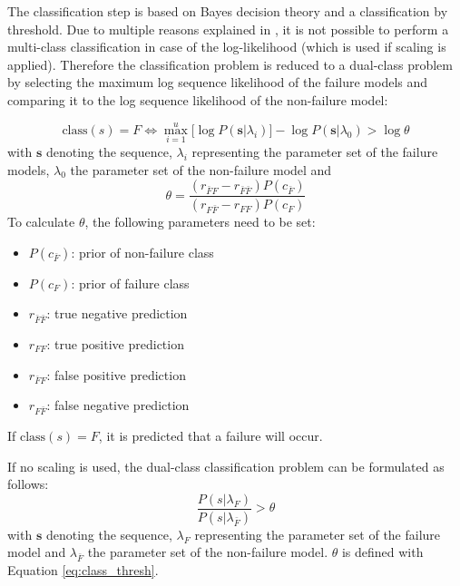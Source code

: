 \documentclass[mscthesis]{usiinfthesis}
\begin{document}
The classification step is based on Bayes decision theory and a classification
by threshold. Due to multiple reasons explained in \cite{salfner08}, it is not
possible to perform a multi-class classification in case of the log-likelihood
(which is used if scaling is applied). Therefore the classification problem is
reduced to a dual-class problem by selecting the maximum log sequence
likelihood of the failure models and comparing it to the log sequence
likelihood of the non-failure model:

\begin{equation}
    \label{eq:class}
    \text{class}(s) = F \iff \max_{i=1}^{u} \big [
        \log P(\boldsymbol{s}|\lambda_i)
    \big ] - \log P(\boldsymbol{s}|\lambda_0) > \log \theta
\end{equation}
with $\boldsymbol{s}$ denoting the sequence, $\lambda_i$ representing the
parameter set of the failure models, $\lambda_0$ the parameter set of the
non-failure model and
\begin{equation}
    \label{eq:class_thresh}
    \theta = \frac{(r_{\bar{F}F} - r_{\bar{F}\bar{F}})P(c_{\bar{F}})}
        {(r_{F \bar{F}} - r_{FF})P(c_{F})}
\end{equation}
To calculate $\theta$, the following parameters need to be set:
\begin{itemize}
    \item $ P(c_{\bar{F}}) $: prior of non-failure class
    \item $ P(c_F) $: prior of failure class
    \item $ r_{\bar{F}\bar{F}} $: true negative prediction
    \item $ r_{FF} $: true positive prediction
    \item $ r_{\bar{F}F} $: false positive prediction
    \item $ r_{F\bar{F}} $: false negative prediction
\end{itemize}
If $\text{class}(s) = F$, it is predicted that a failure will occur.

If no scaling is used, the dual-class classification problem can be formulated
as follows:
\begin{equation}
    \label{eq:class_ns}
    \frac{P(s|\lambda_F)}{P(s|\lambda_{\bar{F}})} > \theta
\end{equation}
with $\boldsymbol{s}$ denoting the sequence, $\lambda_F$ representing the
parameter set of the failure model and $\lambda_{\bar{F}}$ the parameter set of
the non-failure model. $\theta$ is defined with Equation \ref{eq:class_thresh}.
\end{document}
